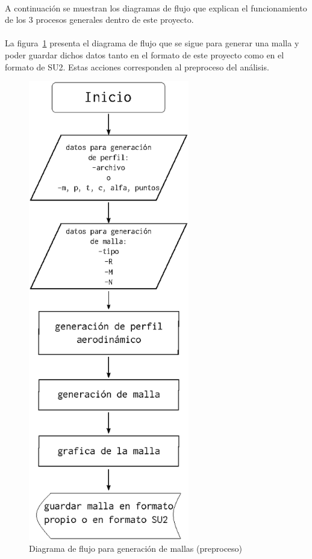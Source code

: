 \documentclass[letterpaper, openright, 12pt]{book}
\begin{document}
    \paragraph*{}
        A continuación se muestran los diagramas de flujo que explican el
        funcionamiento de los 3 procesos generales dentro de este proyecto.

    \paragraph*{}
        La figura~\ref{flujo_malla} presenta el diagrama de flujo que se sigue
        para generar una malla y poder guardar dichos datos tanto en el
        formato de este proyecto como en el formato de SU2. Estas acciones
        corresponden al preproceso del análisis.

    \begin{figure}[H]
        \centering
        \includegraphics[keepaspectratio, width=70mm]{./img/flujo_malla}
        \caption{Diagrama de flujo para generación de mallas (preproceso)}
        \label{flujo_malla}
    \end{figure}
\end{document}
